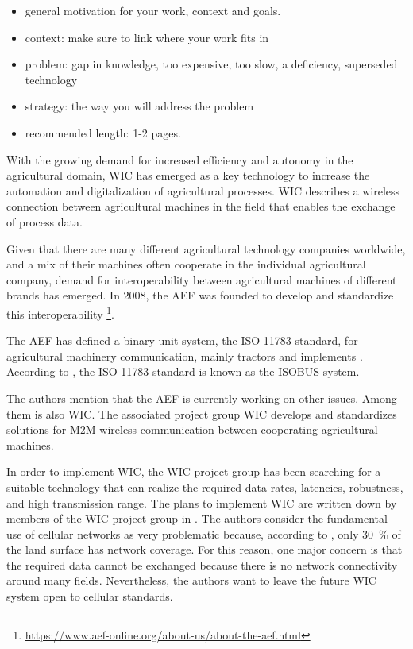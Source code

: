 
\begin{itemize}
\item general motivation for your work, context and goals.
\item context: make sure to link where your work fits in
\item problem: gap in knowledge, too expensive, too slow, a deficiency, superseded technology
\item strategy: the way you will address the problem
\item recommended length: 1-2 pages.
\end{itemize}
With the growing demand for increased efficiency and autonomy in the agricultural domain, \ac{WIC} has emerged as a key technology to increase the automation
and digitalization of agricultural processes. \ac{WIC} describes a wireless connection between agricultural machines
in the field that enables the exchange of process data.

Given that there are many different agricultural technology companies worldwide, and a mix of their machines often cooperate in
the individual agricultural company, demand for interoperability between agricultural machines of different brands
has emerged.
In 2008, the \ac{AEF} was founded to develop and standardize this interoperability
\footnote{\url{https://www.aef-online.org/about-us/about-the-aef.html}}.

The AEF has defined a binary unit system, the ISO 11783 standard, for agricultural machinery communication, mainly tractors and
implements \cite{iglesias_enabling_2014}.
According to \textcite{schlingmann_aef_2019}, the ISO 11783 standard is known as
the ISOBUS system.

The authors mention that the AEF is currently working on other issues.
Among them is also \ac{WIC}.
The associated project group \ac{WIC} develops and standardizes solutions for \ac{M2M} wireless
communication between cooperating agricultural machines.

In order to implement \ac{WIC}, the \ac{WIC} project group has been searching for a suitable technology
that can realize the required data rates, latencies, robustness, and high transmission range.
The plans to implement \ac{WIC} are written down by members of the \ac{WIC} project group in \cite{schlingmann_challenges_2017}.
The authors consider the fundamental use of cellular networks as very problematic
because, according to \cite{itu2016facts}, only \SI{30}{\percent} of the land surface has network coverage.
For this reason, one major concern is that the required data cannot be exchanged because there is
no network connectivity around many fields.
Nevertheless, the authors want to leave the future \ac{WIC} system open
to cellular standards.


